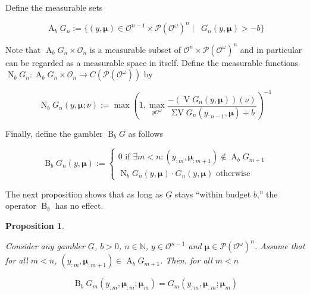 \documentclass[11pt]{article}
\theoremstyle{definition}
\theoremstyle{plain}
\newtheorem{proposition}{Proposition}%
\newcommand{\Nats}{\mathbb{N}}
\newcommand{\B}{\operatorname{B}}
\newcommand{\PM}{\mathcal{P}}
\newcommand{\Ob}{\mathcal{O}}
\newcommand{\OO}{\Ob^\omega}
\newcommand{\PMO}{\PM(\OO)}
\DeclareMathOperator{\V}{V}
\DeclareMathOperator{\SV}{\Sigma V}
\DeclareMathOperator{\SVM}{\Sigma V_{\min}}
\DeclareMathOperator{\Ab}{A}
\DeclareMathOperator{\Nr}{N}
\newcommand{\BM}{\bm{\mu}}
\begin{document}
Define the measurable sets

\begin{equation}
\Ab_b G_n:=\{(y,\BM) \in \Ob^{n-1} \times \PMO^n \mid \SVM G_n(y,\BM) > -b\}
\end{equation}

Note that $\Ab_b G_n \times \Ob_n$ is a measurable subset of $\Ob^n \times \PMO^n$ and in particular can be regarded as a measurable space in itself. Define the measurable functions $\Nr_b G_n: \Ab_b G_n \times \Ob_n \rightarrow C(\PMO)$ by

\begin{equation}
\Nr_b G_n(y,\BM;\nu):=\max(1,\max_{y\OO} \frac{-(\V G_n(y,\BM))(\nu)}{\SV G_n(y_{:n-1},\BM)+b})^{-1}
\end{equation}

Finally, define the gambler $\B_b G$ as follows

\begin{equation}
\B_b G_n(y,\BM):=\begin{cases} 0 \text{ if } \exists m < n: (y_{:m},\BM_{:m+1}) \not\in \Ab_b G_{m+1} \\ \Nr_b G_n(y,\BM) \cdot G_n(y, \BM) \text{ otherwise} \end{cases}
\end{equation}

The next proposition shows that as long as $G$ stays \enquote{within budget $b$,} the operator $\B_b$ has no effect. 

\begin{proposition}
\label{prp:b_no_effect}

Consider any gambler $G$, $b > 0$, $n \in \Nats$, $y \in \Ob^{n - 1}$ and $\BM \in \PMO^n$. Assume that for all $m < n$, $(y_{:m},\BM_{:m+1}) \in \Ab_b G_{m+1}$. Then, for all $m < n$

\begin{equation}
\B_b G_m(y_{:m},\BM_{:m};\BM_m)=G_m(y_{:m},\BM_{:m};\BM_m)
\end{equation}

\end{proposition}
\end{document}
